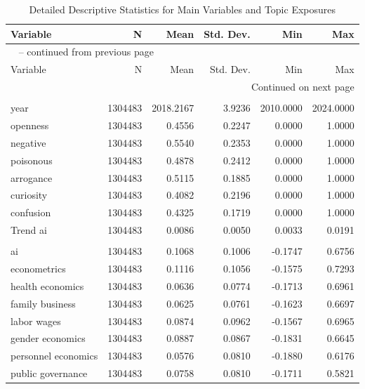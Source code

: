 \documentclass[11pt]{article}
\begin{document}
\begin{center}
\scriptsize
\setlength{\tabcolsep}{4pt}
\begin{longtable}{lrrrrr}
\caption{Detailed Descriptive Statistics for Main Variables and Topic Exposures}\label{tab:descriptive_means}\\
\toprule
Variable & N & Mean & Std. Dev. & Min & Max \\
\midrule
\endfirsthead
\multicolumn{6}{l}{\tablename\ \thetable{} -- continued from previous page}\\
\toprule
Variable & N & Mean & Std. Dev. & Min & Max \\
\midrule
\endhead
\midrule
\multicolumn{6}{r}{Continued on next page}\\
\endfoot
\bottomrule
\endlastfoot
\addlinespace
\multicolumn{6}{l}{\textit{Core variables}} \\
year & 1304483 & 2018.2167 & 3.9236 & 2010.0000 & 2024.0000 \\
openness & 1304483 & 0.4556 & 0.2247 & 0.0000 & 1.0000 \\
negative & 1304483 & 0.5540 & 0.2353 & 0.0000 & 1.0000 \\
poisonous & 1304483 & 0.4878 & 0.2412 & 0.0000 & 1.0000 \\
arrogance & 1304483 & 0.5115 & 0.1885 & 0.0000 & 1.0000 \\
curiosity & 1304483 & 0.4082 & 0.2196 & 0.0000 & 1.0000 \\
confusion & 1304483 & 0.4325 & 0.1719 & 0.0000 & 1.0000 \\
Trend ai & 1304483 & 0.0086 & 0.0050 & 0.0033 & 0.0191 \\
\addlinespace
\multicolumn{6}{l}{\textit{Publication-side topic exposures}} \\
ai & 1304483 & 0.1068 & 0.1006 & -0.1747 & 0.6756 \\
econometrics & 1304483 & 0.1116 & 0.1056 & -0.1575 & 0.7293 \\
health economics & 1304483 & 0.0636 & 0.0774 & -0.1713 & 0.6961 \\
family business & 1304483 & 0.0625 & 0.0761 & -0.1623 & 0.6697 \\
labor wages & 1304483 & 0.0874 & 0.0962 & -0.1567 & 0.6965 \\
gender economics & 1304483 & 0.0887 & 0.0867 & -0.1831 & 0.6645 \\
personnel economics & 1304483 & 0.0576 & 0.0810 & -0.1880 & 0.6176 \\
public governance & 1304483 & 0.0758 & 0.0810 & -0.1711 & 0.5821 \\

\end{longtable}
\end{center}
\end{document}
